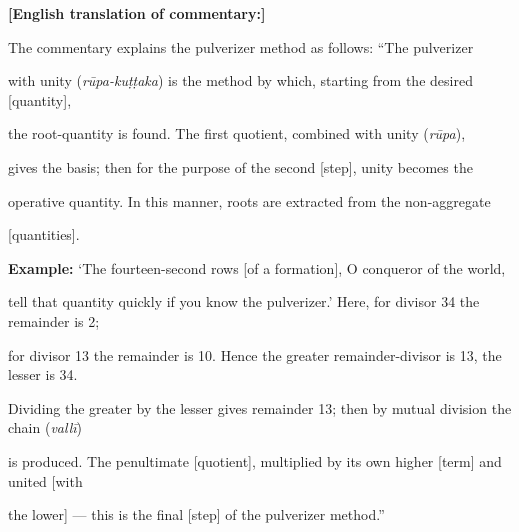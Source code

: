 \documentclass[10pt,a4paper]{article}
\begin{document}
\begin{minipage}[t]{0.47\textwidth}


\end{minipage}%

\hfill\vline\hfill%

\begin{minipage}[t]{0.47\textwidth}

\textbf{[English translation of commentary:]}

The commentary explains the pulverizer method as follows: ``The pulverizer

with unity (\textit{rūpa-kuṭṭaka}) is the method by which, starting from the desired [quantity],

the root-quantity is found. The first quotient, combined with unity (\textit{rūpa}),

gives the basis; then for the purpose of the second [step], unity becomes the

operative quantity. In this manner, roots are extracted from the non-aggregate

[quantities].



\textbf{Example:} `The fourteen-second rows [of a formation], O conqueror of the world,

tell that quantity quickly if you know the pulverizer.' Here, for divisor 34 the remainder is 2;

for divisor 13 the remainder is 10. Hence the greater remainder-divisor is 13, the lesser is 34.

Dividing the greater by the lesser gives remainder 13; then by mutual division the chain (\textit{vallī})

is produced. The penultimate [quotient], multiplied by its own higher [term] and united [with

the lower] --- this is the final [step] of the pulverizer method.''

\end{minipage}
\end{document}
